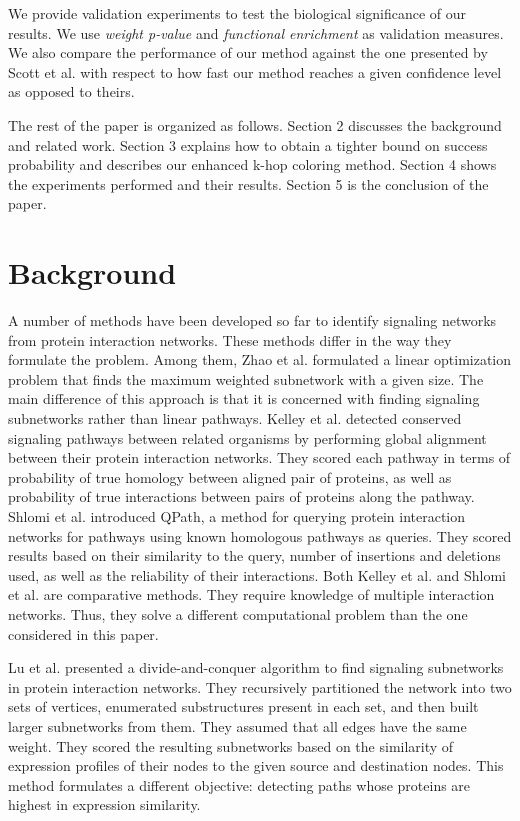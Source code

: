 \documentclass{ws-procs11x85}
\begin{document}
We provide validation experiments to test the biological significance of our
results. We use \textit{weight p-value} and \textit{functional enrichment} as
validation measures. We also compare the performance of our method against the
one presented by Scott et al.\cite{scott} with respect to how fast our method
reaches a given confidence level as opposed to theirs.

The rest of the paper is organized as follows. Section 2 discusses the
background and related work. Section 3 explains how to obtain a tighter bound on
success probability and describes our enhanced k-hop coloring method. Section 4
shows the experiments performed and their results. Section 5 is the conclusion
of the paper.


\section{Background}

A number of methods have been developed so far to identify signaling networks
from protein interaction networks. These methods differ in the way they
formulate the problem. Among them, Zhao et al.\cite{zhao} formulated a linear
optimization problem that finds the maximum weighted subnetwork with a given
size. The main difference of this approach is that it is concerned with finding
signaling subnetworks rather than linear pathways. Kelley et al.\cite{kelley}
detected conserved signaling pathways between related organisms by performing
global alignment between their protein interaction networks. They scored each
pathway in terms of probability of true homology between aligned pair of
proteins, as well as probability of true interactions between pairs of proteins
along the pathway. Shlomi et al.\cite{shlomi} introduced QPath, a method for
querying protein interaction networks for pathways using known homologous
pathways as queries. They scored results based on their similarity to the
query, number of insertions and deletions used, as well as the reliability of
their interactions. Both Kelley et al.\cite{kelley} and Shlomi et
al.\cite{shlomi} are comparative methods. They require knowledge of multiple
interaction networks. Thus, they solve a different computational problem than
the one considered in this paper.

Lu et al.\cite{lu} presented a divide-and-conquer algorithm to find signaling
subnetworks in protein interaction networks. They recursively partitioned the
network into two sets of vertices, enumerated substructures present in each
set, and then built larger subnetworks from them. They assumed that all edges
have the same weight. They scored the resulting subnetworks based on the
similarity of expression profiles of their nodes to the given source and
destination nodes. This method formulates a different objective: detecting
paths whose proteins are highest in expression similarity.
\end{document}
